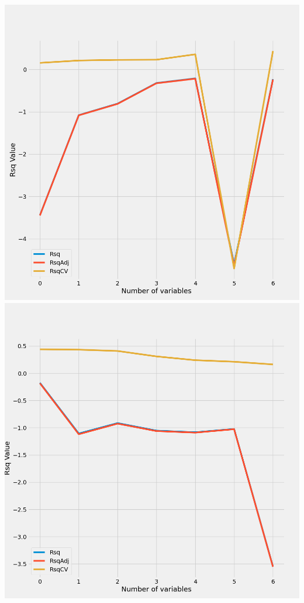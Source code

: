 \documentclass{article}
\begin{document}
	\includegraphics[scale = 0.2]{../plots/python/ConcreteForwardPCP.png} 
	\includegraphics[scale = 0.2]{../plots/python/ConcreteBackwardPCP.png}
\end{document}

